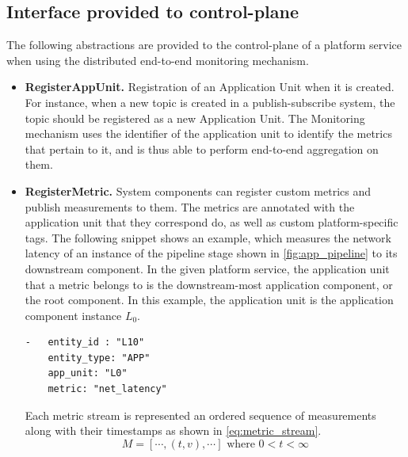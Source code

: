\subsection{Interface provided to control-plane}
The following abstractions are provided to the control-plane of a platform service when using the distributed end-to-end monitoring mechanism.
\begin{itemize}
\item \textbf{RegisterAppUnit.} Registration of an Application Unit when it is created. For instance, when a new topic is created in a publish-subscribe system, the topic should be registered as a new Application Unit. The Monitoring mechanism uses the identifier of the application unit to identify the metrics that pertain to it, and is thus able to perform end-to-end aggregation on them.
\item \textbf{RegisterMetric.} System components can register custom metrics and publish measurements to them. The metrics are annotated with the application unit that they correspond do, as well as custom platform-specific tags. The following snippet shows an example, which measures the network latency of an instance of the pipeline stage shown in \cref{fig:app_pipeline} to its downstream component. In the given platform service, the application unit that a metric belongs to is the downstream-most application component, or the root component. In this example, the application unit is the application component instance $L_0$.
\begin{verbatim}
-   entity_id : "L10"
    entity_type: "APP"
    app_unit: "L0"
    metric: "net_latency"
\end{verbatim}
Each metric stream is represented an ordered sequence of measurements along with their timestamps as shown in \cref{eq:metric_stream}.
\begin{equation}
M = \left[ \cdots , \left( t, v \right) , \cdots \right] \text{ where } 0 < t < \infty
\label{eq:metric_stream}
\end{equation}


\end{itemize}
